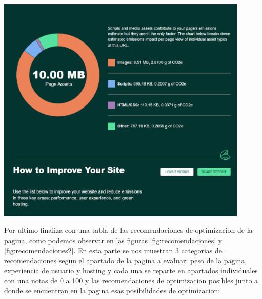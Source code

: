 \documentclass[12pt,a4paper]{report}
\begin{document}
\begin{center}
  \includegraphics[width=0.9\textwidth]{imagenes/Ecograder_3.png}
  \label{fig:estimacionassets}
\end{center}

Por ultimo finaliza con una tabla de las recomendaciones de optimizacion de la pagina, como podemos observar en las figuras \ref{fig:recomendaciones} y \ref{fig:recomendaciones2}.
En esta parte se nos muestran 3 categorias de recomendaciones segun el apartado de la pagina a evaluar: peso de la pagina, experiencia de usuario y hosting y cada una se reparte en apartados individuales con una notas de 0 a 100 y las
recomendaciones de optimizacion posibles junto a donde se encuentran en la pagina esas posibilidades de optimizacion:
\end{document}

